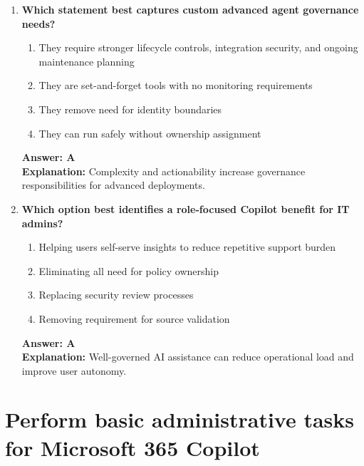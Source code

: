 \documentclass[10pt]{article}
\begin{document}
\begin{enumerate}[leftmargin=*]
\item \textbf{Which statement best captures custom advanced agent governance needs?}
\begin{enumerate}[label=\Alph*.]
  \item They require stronger lifecycle controls, integration security, and ongoing maintenance planning
  \item They are set-and-forget tools with no monitoring requirements
  \item They remove need for identity boundaries
  \item They can run safely without ownership assignment
\end{enumerate}
\textbf{Answer: A}\\
\textbf{Explanation:} Complexity and actionability increase governance responsibilities for advanced deployments.

\item \textbf{Which option best identifies a role-focused Copilot benefit for IT admins?}
\begin{enumerate}[label=\Alph*.]
  \item Helping users self-serve insights to reduce repetitive support burden
  \item Eliminating all need for policy ownership
  \item Replacing security review processes
  \item Removing requirement for source validation
\end{enumerate}
\textbf{Answer: A}\\
\textbf{Explanation:} Well-governed AI assistance can reduce operational load and improve user autonomy.

\end{enumerate}


\clearpage
\section{Perform basic administrative tasks for Microsoft 365 Copilot}
\setcounter{subsection}{0}
\clearpage
\end{document}
